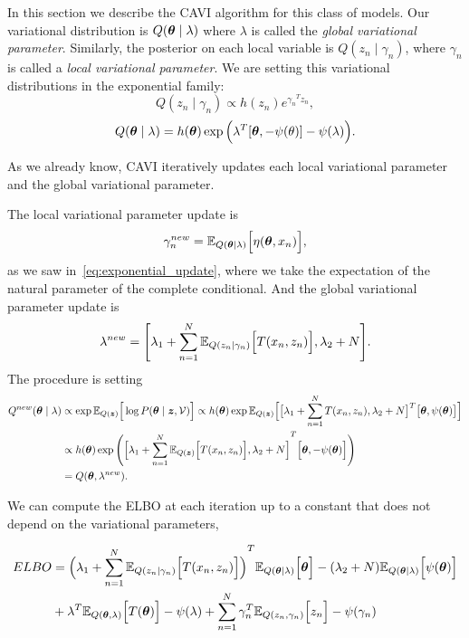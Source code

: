 In this section we describe the CAVI algorithm for this class of models. Our variational distribution is \(Q(\bm{\theta} \mid \lambda)\) where \(\lambda\) is called the \emph{global variational parameter}. Similarly, the posterior on each local variable is \(Q(z_{n} \mid \gamma_{n})\), where \(\gamma_{n}\) is called a \emph{local variational parameter}.
We are setting this variational distributions in the exponential family:
\[
  Q(z_{n} \mid \gamma_{n}) \propto h(z_{n})e^{{\gamma_{n}}^{T}z_{n}},
\]
\[
  Q(\bm{\theta} \mid \lambda) = h(\bm{\theta}) \exp \Big( {\lambda}^{T}[\bm{\theta}, -\psi(\theta)] - \psi(\lambda) \Big).
\]

As we already know, CAVI iteratively updates each local variational parameter and the global variational parameter.

The local variational parameter update is
\[
  \gamma_{n}^{new} = \mathbb{E}_{Q(\bm{\theta} \mid \lambda)}\Big[\eta(\bm{\theta}, x_{n})\Big],
\]
as we saw in~\ref{eq:exponential_update}, where we take the expectation of the natural parameter of the complete conditional. And the global variational parameter update is
\[
  \lambda^{new} = \Bigg[ \lambda_{1} + \sum_{n=1}^{N} \mathbb{E}_{Q(z_{n}\mid \gamma_{n})}\Big[T(x_{n},z_{n})\Big], \lambda_{2} + N \Bigg].
\]
The procedure is setting
\[
  \begin{aligned}
    Q^{new}(\bm{\theta} \mid \lambda) &\propto \exp \mathbb{E}_{Q(\bm{z})}\Big[\log P(\bm{\theta} \mid \bm{z} , \mathcal{V})\Big] \propto h(\bm{\theta}) \exp \mathbb{E}_{Q(\bm{z})}\Big[\big[  \lambda_{1} + \sum_{n=1}^{N}T(x_{n}, z_{n}), \lambda_{2} + N \big]^{T}\big[ \bm{\theta}, \psi(\bm{\theta}) \big]\Big]\\
    &\propto h(\bm{\theta}) \exp \Bigg( {\Big[  \lambda_{1} + \sum_{n=1}^{N}\mathbb{E}_{Q(\bm{z})}\Big[T(x_{n}, z_{n})\Big], \lambda_{2} + N \Big]}^{T}\Big[ \bm{\theta}, - \psi(\bm{\theta}) \Big]\Bigg)\\
    &= Q(\bm{\theta}, \lambda^{new}).
  \end{aligned}
\]

We can compute the ELBO at each iteration up to a constant that does not depend on the variational parameters,

\[
  \begin{aligned}
    ELBO &= {\Big( \lambda_{1} + \sum_{n=1}^{N} \mathbb{E}_{Q(z_{n}\mid \gamma_{n})}\Big[T(x_{n},z_{n})\Big]\Big)}^{T}\mathbb{E}_{Q(\bm{\theta} \mid \lambda)}\Big[\bm{\theta}\Big] - (\lambda_{2} + N) \mathbb{E}_{Q(\bm{\theta} \mid \lambda)}\Big[\psi(\bm{\theta})\Big]\\
    &+ \lambda ^{T} \mathbb{E}_{Q(\bm{\theta}, \lambda)}\Big[T(\bm{\theta})\Big] - \psi(\lambda) + \sum_{n=1}^{N}\gamma_{n}^{T}\mathbb{E}_{Q(z_{n}, \gamma_{n})}\Big[z_{n}\Big] - \psi(\gamma_{n})
  \end{aligned}
\]

